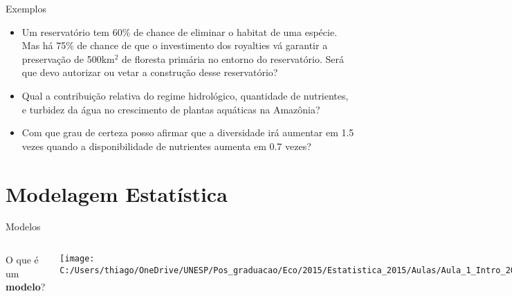 \documentclass{beamer}\usepackage[]{graphicx}\usepackage[]{color}
\begin{document}
\begin{frame}{Exemplos}

\begin{small}

 \begin{itemize}
  
      \item{Um reservatório tem 60\% de chance de eliminar o habitat de uma espécie. Mas há 75\% de chance de que o investimento dos royalties vá garantir a preservação de 500km$^2$ de floresta primária no entorno do reservatório. Será que devo autorizar ou vetar a construção desse reservatório?}
    
    \vfill
    
      \item{Qual a contribuição relativa do regime hidrológico, quantidade de nutrientes, e turbidez da água no crescimento de plantas aquáticas na Amazônia?}
  
  \vfill
  
    \item{Com que grau de certeza posso afirmar que a diversidade irá aumentar em 1.5 vezes quando a disponibilidade de nutrientes aumenta em 0.7 vezes?}
  
  \end{itemize}
  
\end{small}

\end{frame}


\section{Modelagem Estatística}


\begin{frame}{Modelos}
\begin{columns}[c]
\column{3in}
\huge{O que é um \textbf{modelo}?}

\column{1.5in}
\texttt{[image: C:/Users/thiago/OneDrive/UNESP/Pos\_graduacao/Eco/2015/Estatistica\_2015/Aulas/Aula\_1\_Intro\_2015/figs/bruno.jpg]}
\end{columns}
\end{frame}
\end{document}
